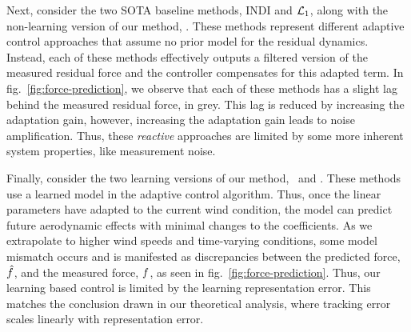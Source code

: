 Next, consider the two SOTA baseline methods, INDI and ${\mathcal{L}_1}$, along with the non-learning version of our method, \nfconstant. These methods represent different adaptive control approaches that assume no prior model for the residual dynamics. Instead, each of these methods effectively outputs a filtered version of the measured residual force and the controller compensates for this adapted term. In fig.~\ref{fig:force-prediction}, we observe that each of these methods has a slight lag behind the measured residual force, in grey. This lag is reduced by increasing the adaptation gain, however, increasing the adaptation gain leads to noise amplification. Thus, these \emph{reactive} approaches are limited by some more inherent system properties, like measurement noise.

Finally, consider the two learning versions of our method, \nf~and \nftransfer. These methods use a learned model in the adaptive control algorithm. Thus, once the linear parameters have adapted to the current wind condition, the model can predict future aerodynamic effects with minimal changes to the coefficients. As we extrapolate to higher wind speeds and time-varying conditions, some model mismatch occurs and is manifested as discrepancies between the predicted force, $\hat{ f}$, and the measured force, $ f$, as seen in fig.~\ref{fig:force-prediction}. Thus, our learning based control is limited by the learning representation error. This matches the conclusion drawn in our theoretical analysis, where tracking error scales linearly with representation error.



